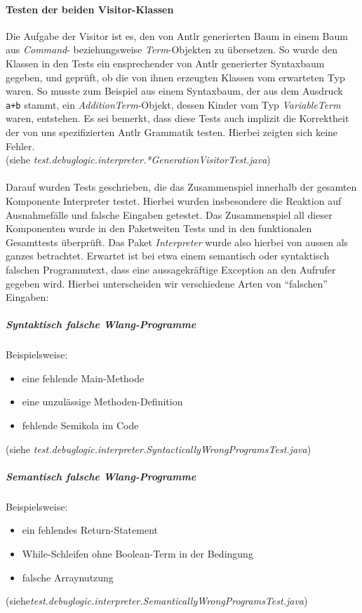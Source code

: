 \documentclass[parskip=full]{scrartcl}
\begin{document}
\paragraph{Testen der beiden Visitor-Klassen}
Die Aufgabe der Visitor ist es, den von Antlr generierten Baum in einem Baum aus \textit{Command}- beziehungsweise \textit{Term}-Objekten zu übersetzen. 
So wurde den Klassen in den Tests ein ensprechender von Antlr generierter Syntaxbaum gegeben, und geprüft, ob die von ihnen erzeugten Klassen vom erwarteten Typ waren. So musste zum Beispiel aus einem Syntaxbaum, der aus dem Ausdruck \texttt{a+b} stammt, ein \textit{AdditionTerm}-Objekt, dessen Kinder vom Typ \textit{VariableTerm} waren, entstehen. Es sei bemerkt, dass diese Tests auch implizit die Korrektheit der von uns spezifizierten Antlr Grammatik testen.
Hierbei zeigten sich keine Fehler.\\
(siehe \textit{test.debuglogic.interpreter.*GenerationVisitorTest.java})
\\\\
Darauf wurden Tests geschrieben, die das Zusammenspiel innerhalb der gesamten Komponente Interpreter testet. Hierbei wurden insbesondere die Reaktion auf Ausnahmefälle und falsche Eingaben getestet.
Das Zusammenspiel all dieser Komponenten wurde in den Paketweiten Tests und in den funktionalen Gesamttests überprüft. Das Paket \textit{Interpreter} wurde also hierbei von aussen als ganzes betrachtet. 
Erwartet ist bei etwa einem semantisch oder syntaktisch falschen Programmtext, dass eine aussagekräftige Exception an den Aufrufer gegeben wird. Hierbei unterscheiden wir verschiedene Arten von \enquote{falschen} Eingaben:
\subparagraph{Syntaktisch falsche Wlang-Programme}
Beispielsweise:
\begin{itemize}
\item eine fehlende Main-Methode
\item eine unzulässige Methoden-Definition
\item fehlende Semikola im Code
\end{itemize}
(siehe \textit{test.debuglogic.interpreter.SyntacticallyWrongProgramsTest.java})\\
\subparagraph{Semantisch falsche Wlang-Programme}
Beispielsweise:
\begin{itemize}
\item ein fehlendes Return-Statement
\item While-Schleifen ohne Boolean-Term in der Bedingung
\item falsche Arraynutzung
\end{itemize}
(siehe\textit{test.debuglogic.interpreter.SemanticallyWrongProgramsTest.java})\\
\end{document}
